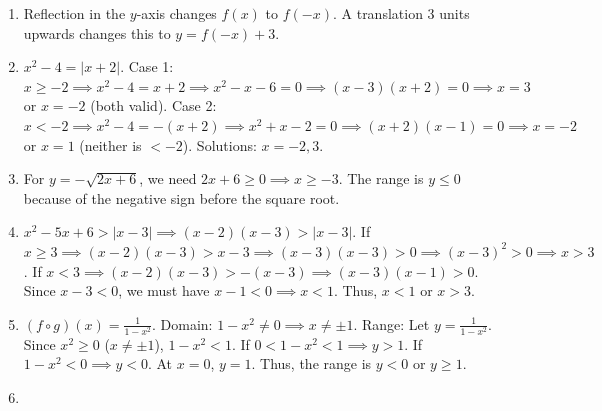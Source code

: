 \documentclass[11pt,a4paper]{article}
\begin{document}
\begin{enumerate}
    \item Reflection in the $y$-axis changes $f(x)$ to $f(-x)$. A translation 3 units upwards changes this to $y = f(-x) + 3$.
    \vspace{0.5cm}

    \item $x^2 - 4 = |x + 2|$.
    Case 1: $x \ge -2 \implies x^2 - 4 = x + 2 \implies x^2 - x - 6 = 0 \implies (x-3)(x+2) = 0 \implies x = 3$ or $x = -2$ (both valid).
    Case 2: $x < -2 \implies x^2 - 4 = -(x+2) \implies x^2 + x - 2 = 0 \implies (x+2)(x-1) = 0 \implies x = -2$ or $x = 1$ (neither is $< -2$).
    Solutions: $x = -2, 3$.
    \vspace{0.5cm}

    \item For $y = -\sqrt{2x+6}$, we need $2x+6 \ge 0 \implies x \ge -3$. The range is $y \le 0$ because of the negative sign before the square root.
    \vspace{0.5cm}

    \item $x^2 - 5x + 6 > |x - 3| \implies (x-2)(x-3) > |x-3|$.
    If $x \ge 3 \implies (x-2)(x-3) > x-3 \implies (x-3)(x-3) > 0 \implies (x-3)^2 > 0 \implies x > 3$.
    If $x < 3 \implies (x-2)(x-3) > -(x-3) \implies (x-3)(x-1) > 0$. Since $x-3 < 0$, we must have $x-1 < 0 \implies x < 1$.
    Thus, $x < 1$ or $x > 3$.
    \vspace{0.5cm}

    \item $(f \circ g)(x) = \frac{1}{1 - x^2}$.
    Domain: $1 - x^2 \neq 0 \implies x \neq \pm 1$.
    Range: Let $y = \frac{1}{1-x^2}$. Since $x^2 \ge 0$ ($x \neq \pm 1$), $1-x^2 < 1$.
    If $0 < 1-x^2 < 1 \implies y > 1$.
    If $1-x^2 < 0 \implies y < 0$.
    At $x=0$, $y=1$. Thus, the range is $y < 0$ or $y \ge 1$.
    \vspace{0.5cm}

    \item 
    \vspace{0.5cm}


\end{enumerate}
\end{document}
